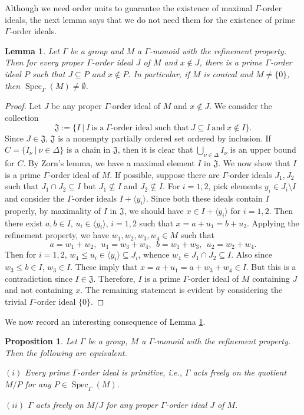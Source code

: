 \documentclass[a4paper,reqno,12pt]{amsart}
\numberwithin{equation}{section}
\newtheorem{lem}[thm]{Lemma}
\newtheorem{prop}[thm]{Proposition}
\theoremstyle{definition}
\theoremstyle{remark}
\newcommand{\Spec}{\operatorname{Spec}}
\begin{document}
Although we need order units to guarantee the existence of maximal $\Gamma$-order ideals, the next lemma says that we do not need them for the existence of prime $\Gamma$-order ideals. 
\begin{lem}\label{lem proper ideal contained in a prime ideal}
Let $\Gamma$ be a group and $M$ a $\Gamma$-monoid with the refinement property. Then for every proper $\Gamma$-order ideal $J$ of $M$ and $x\notin J$, there is a prime $\Gamma$-order ideal $P$ such that $J\subseteq P$ and $x\notin P$. In particular, if $M$ is conical and $M\neq \{0\}$, then $\Spec_\Gamma(M)\neq \emptyset$.    
\end{lem}
\begin{proof}
Let $J$ be any proper $\Gamma$-order ideal of $M$ and $x\notin J$. We consider the collection \[\mathfrak{J}:=\{I~|~I~\text{is a}~\Gamma\text{-order ideal such that}~J\subseteq I~\text{and}~x\notin I\}.\] Since $J\in \mathfrak{J}$, $\mathfrak{J}$ is a nonempty partially ordered set ordered by inclusion. If $C=\{I_\nu~|~\nu\in \Delta\}$ is a chain in $\mathfrak{J}$, then it is clear that $\displaystyle{\bigcup_{\nu\in \Delta}}I_\nu$ is an upper bound for $C$. By Zorn's lemma, we have a maximal element $I$ in $\mathfrak{J}$. We now show that $I$ is a prime $\Gamma$-order ideal of $M$. If possible, suppose there are $\Gamma$-order ideals $J_1,J_2$ such that $J_1\cap J_2\subseteq I$ but $J_1\nsubseteq I$ and $J_2\nsubseteq I$. For $i=1,2$, pick elements $y_i\in J_i\setminus I$ and consider the $\Gamma$-order ideals $I+\langle y_i\rangle$. Since both these ideals contain $I$ properly, by maximality of $I$ in $\mathfrak{J}$, we should have $x\in I+\langle y_i\rangle$ for $i=1,2$. Then there exist $a,b\in I$, $u_i\in \langle y_i\rangle$, $i=1,2$ such that $x=a+u_1=b+u_2$. Applying the refinement property, we have $w_1,w_2,w_3,w_4\in M$ such that \[a=w_1+w_2,~~u_1=w_3+w_4,~~b=w_1+w_3,~~u_2=w_2+w_4.\] Then for $i=1,2$, $w_4\le u_i\in \langle y_i\rangle\subseteq J_i$, whence $w_4\in J_1\cap J_2\subseteq I$. Also since $w_3\le b\in I$, $w_3\in I$. These imply that $x=a+u_1=a+w_3+w_4\in I$. But this is a contradiction since $I\in \mathfrak{J}$. Therefore, $I$ is a prime $\Gamma$-order ideal of $M$ containing $J$ and not containing $x$. The remaining statement is evident by considering the trivial $\Gamma$-order ideal $\{0\}$. 
\end{proof}
We now record an interesting consequence of Lemma \ref{lem proper ideal contained in a prime ideal}.
\begin{prop}\label{pro free action on prime quotient is enough}
Let $\Gamma$ be a group, $M$ a $\Gamma$-monoid with the refinement property. Then the following are equivalent.

$(i)$ Every prime $\Gamma$-order ideal is primitive, i.e., $\Gamma$ acts freely on the quotient $M/{P}$ for any $P\in \Spec_\Gamma(M)$.

$(ii)$ $\Gamma$ acts freely on $M/{J}$ for any proper $\Gamma$-order ideal $J$ of $M$.
\end{prop}
\end{document}
